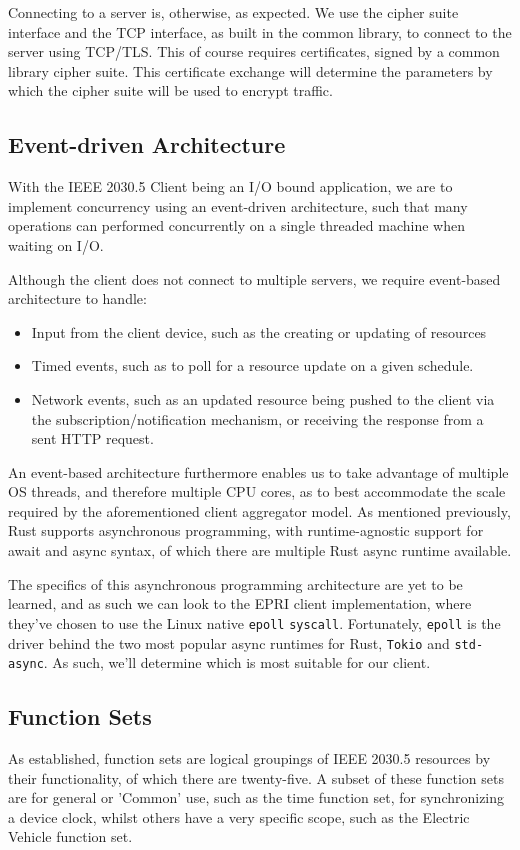 Connecting to a server is, otherwise, as expected. We use the cipher suite interface and the TCP interface, as built in the common library, to connect to the server using TCP/TLS.
This of course requires certificates, signed by a common library cipher suite. This certificate exchange will determine the parameters by which the cipher suite will be used to encrypt traffic.

\subsection{Event-driven Architecture}
With the IEEE 2030.5 Client being an I/O bound application, we are to implement concurrency using an event-driven architecture, such that many operations can performed concurrently on a single threaded machine when waiting on I/O.

Although the client does not connect to multiple servers, we require event-based architecture to handle:
\begin{itemize}
    \item Input from the client device, such as the creating or updating of resources
    \item Timed events, such as to poll for a resource update on a given schedule.
    \item Network events, such as an updated resource being pushed to the client via the subscription/notification mechanism, or receiving the response from a sent HTTP request.
\end{itemize}

An event-based architecture furthermore enables us to take advantage of multiple OS threads, and therefore multiple CPU cores, as to best accommodate the scale required by the aforementioned client aggregator model.
As mentioned previously, Rust supports asynchronous programming, with runtime-agnostic support for await and async syntax, of which there are multiple Rust async runtime available.

The specifics of this asynchronous programming architecture are yet to be learned, and as such we can look to the EPRI client implementation, where they've chosen to use the Linux native \texttt{epoll} \texttt{syscall}.
Fortunately, \texttt{epoll} is the driver behind the two most popular async runtimes for Rust, \texttt{Tokio} and \texttt{std-async}. As such, we'll determine which is most suitable for our client.

\subsection{Function Sets}
As established, function sets are logical groupings of IEEE 2030.5 resources by their functionality, of which there are twenty-five.
A subset of these function sets are for general or 'Common' use, such as the time function set, for synchronizing a device clock, whilst others have a very specific scope, such as the Electric Vehicle function set. 

